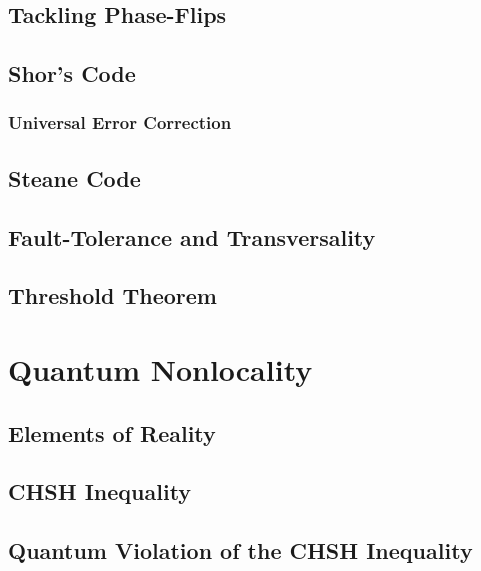 	\section{Tackling Phase-Flips} %

	\section{Shor's Code} %

		\subsection{Universal Error Correction} %

	\section{Steane Code} %

	\section{Fault-Tolerance and Transversality} %

	\section{Threshold Theorem} %

\chapter{Quantum Nonlocality} %

	\section{Elements of Reality} %

	\section{CHSH Inequality} %

	\section{Quantum Violation of the CHSH Inequality} %

